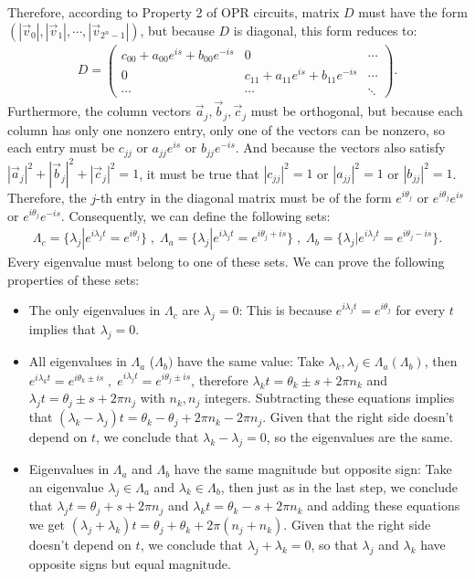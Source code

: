 Therefore, according to Property 2 of OPR circuits,
matrix $D$ must have the form $(|\vec{v}_0|, |\vec{v}_1|, \cdots , |\vec{v}_{2^n-1}|)$, 
but because $D$ is diagonal, this form reduces to:
\begin{eqnarray}
D = \begin{pmatrix}
c_{00} + a_{00} e^{is} + b_{00} e^{-is} & 0 & \cdots  \\
0& c_{11} + a_{11} e^{is} + b_{11} e^{-is} & \cdots  \\
 \cdots & \cdots & \ddots 
\end{pmatrix}.
\end{eqnarray}
Furthermore, the column vectors $\vec{a}_j, \vec{b}_j, \vec{c}_j$ must be orthogonal, but because each column has only one nonzero entry,
only one of the vectors can be nonzero, so each entry must be $c_{jj}$ or $a_{jj} e^{is}$ or $b_{jj} e^{-is}$. 
And because the vectors also satisfy $|\vec{a}_j|^2 + |\vec{b}_j|^2 + |\vec{c}_j|^2 = 1$, it must be true that $|c_{jj}|^2 = 1 $
or $|a_{jj}|^2 = 1$ or $|b_{jj}|^2 =1$.
Therefore, the $j$-th entry in the diagonal matrix must be of the form $e^{i \theta_{j}}$ or
$e^{i \theta_{j}} e^{is}$ or $e^{i \theta_j} e^{-is}$. Consequently, we can define the following sets:
\begin{eqnarray}
\Lambda_c = \{\lambda_j  | e^{i\lambda_j t} = e^{i \theta_j}\} \; ,\;
\Lambda_a = \{\lambda_j  | e^{i\lambda_j t} = e^{i \theta_j + is}\} \;,\;
\Lambda_b = \{\lambda_j  | e^{i\lambda_j t} = e^{i \theta_j-is}\}.
\end{eqnarray}
Every eigenvalue must belong to one of these sets. We can prove the following properties of these sets:
\begin{itemize}
\item The only eigenvalues in $\Lambda_c$ are $\lambda_j = 0$: This is because  $e^{i \lambda_j t}  = e^{i \theta_j}$ for every $t$ implies that $\lambda_j = 0$.
\item All eigenvalues in $\Lambda_a$ ($\Lambda_b)$ have the same value:
Take $\lambda_k , \lambda_j \in \Lambda_a (\Lambda_b)$, then $e^{i\lambda_k t} = e^{i \theta_k \pm is} \; ,\; e^{i\lambda_j t} = e^{i\theta_j \pm is}$,
therefore $\lambda_k t = \theta_k \pm s + 2\pi n_k$ and $\lambda_j t = \theta_j \pm s + 2\pi n_j$ with $n_k, n_j$ integers.
 Subtracting these equations implies that $(\lambda_k - \lambda_j)t = \theta_k - \theta_j + 2\pi n_k - 2\pi n_j$. 
 Given that the right side doesn't depend on $t$, we conclude that $\lambda_k - \lambda_j= 0$, so the eigenvalues are the same.
 
\item Eigenvalues in $\Lambda_a$ and $\Lambda_b$ have the same magnitude but opposite sign: 
Take an eigenvalue $\lambda_j \in \Lambda_a$ and $\lambda_k \in \Lambda_b$, 
then just as in the last step, we conclude that $\lambda_jt =  \theta_j + s + 2\pi n_j$ and $\lambda_kt = \theta_k - s + 2\pi n_k$
and adding these equations we get $(\lambda_j+ \lambda_k)t = \theta_j + \theta_k + 2\pi (n_j + n_k)$. 
Given that the right side doesn't depend on $t$, we conclude that $\lambda_j + \lambda_k =0$, so that $\lambda_j$ and $\lambda_k$ have opposite signs but equal magnitude.
\end{itemize}
